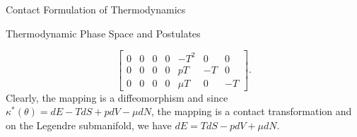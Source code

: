 \begin{section}{Contact Formulation of Thermodynamics}
\begin{subsection}{Thermodynamic Phase Space and Postulates}
\begin{example}
\begin{equation}
\begin{bmatrix}
			0	&	0	&	0	&	0	& -T^2 	&	0	&	0\\
			0	&	0	&	0	&	0	& 	pT 	& 	-T 	& 	0\\
			0	&	0	&	0	&	0	& \mu T	&	0	&	-T
		\end{bmatrix}.
	\end{equation}
	Clearly, the mapping is a diffeomorphism and since $\kappa^*(\theta) = dE -TdS + pdV-\mu dN$, the mapping is a contact transformation and on the Legendre submanifold, we have $dE = TdS-pdV+\mu dN$.
\end{example}


%
%
\end{subsection}
%
%
%
\end{section}
